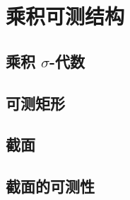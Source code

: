 \section{乘积可测结构}
\label{b1:sec:0701}


\subsection{乘积 \texorpdfstring{\(\sigma\)}{σ}-代数}
\label{b1:subsec:070101}

\subsection{可测矩形}
\label{b1:subsec:070102}

\subsection{截面}
\label{b1:subsec:070103}

\subsection{截面的可测性}
\label{b1:subsec:070104}



